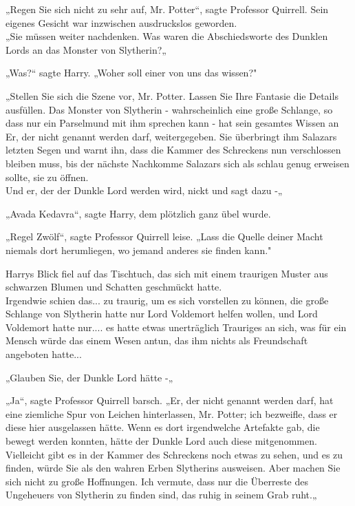 {„Regen Sie sich nicht zu sehr auf, Mr. Potter“, sagte Professor Quirrell. Sein eigenes Gesicht war inzwischen ausdruckslos geworden.\\ „Sie müssen weiter nachdenken. Was waren die Abschiedsworte des Dunklen Lords an das Monster von Slytherin?„

„Was?“ sagte Harry. „Woher soll einer von uns das wissen?"

„Stellen Sie sich die Szene vor, Mr. Potter. Lassen Sie Ihre Fantasie die Details ausfüllen. Das Monster von Slytherin - wahrscheinlich eine große Schlange, so dass nur ein Parselmund mit ihm sprechen kann - hat sein gesamtes Wissen an Er, der nicht genannt werden darf, weitergegeben. Sie überbringt ihm Salazars letzten Segen und warnt ihn, dass die Kammer des Schreckens nun verschlossen bleiben muss, bis der nächste Nachkomme Salazars sich als schlau genug erweisen sollte, sie zu öffnen.\\ Und er, der der Dunkle Lord werden wird, nickt und sagt dazu -„

„Avada Kedavra“, sagte Harry, dem plötzlich ganz übel wurde.

„Regel Zwölf“, sagte Professor Quirrell leise. „Lass die Quelle deiner Macht niemals dort herumliegen, wo jemand anderes sie finden kann."

Harrys Blick fiel auf das Tischtuch, das sich mit einem traurigen Muster aus schwarzen Blumen und Schatten geschmückt hatte.\\ Irgendwie schien das... zu traurig, um es sich vorstellen zu können, die große Schlange von Slytherin hatte nur Lord Voldemort helfen wollen, und Lord Voldemort hatte nur.... es hatte etwas unerträglich Trauriges an sich, was für ein Mensch würde das einem Wesen antun, das ihm nichts als Freundschaft angeboten hatte...

„Glauben Sie, der Dunkle Lord hätte -„

„Ja“, sagte Professor Quirrell barsch. „Er, der nicht genannt werden darf, hat eine ziemliche Spur von Leichen hinterlassen, Mr. Potter; ich bezweifle, dass er diese hier ausgelassen hätte. Wenn es dort irgendwelche Artefakte gab, die bewegt werden konnten, hätte der Dunkle Lord auch diese mitgenommen. Vielleicht gibt es in der Kammer des Schreckens noch etwas zu sehen, und es zu finden, würde Sie als den wahren Erben Slytherins ausweisen. Aber machen Sie sich nicht zu große Hoffnungen. Ich vermute, dass nur die Überreste des Ungeheuers von Slytherin zu finden sind, das ruhig in seinem Grab ruht.„

}
